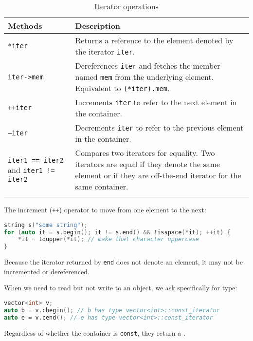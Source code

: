 \begin{longtable}{p{.25\linewidth} p{.7\linewidth}} 
\toprule
Methods & Description \\
\midrule

\texttt{*iter}
& Returns a reference to the element denoted by the iterator \texttt{iter}.
\\

\texttt{iter->mem}
&Dereferences \texttt{iter} and fetches the member named \texttt{mem} from the underlying element. Equivalent to \texttt{(*iter).mem}.
\\

\texttt{++iter}
&Increments \texttt{iter} to refer to the next element in the container.
\\

\texttt{--iter}
&Decrements \texttt{iter} to refer to the previous element in the container.
\\

\texttt{iter1 == iter2} and \texttt{iter1 != iter2}
&Compares two iterators for equality. Two iterators are equal if they denote the same element or if they are off-the-end iterator for the same container.
\\

\midrule
\caption{Iterator operations} 
\label{tab:iteratoroperations}
\end{longtable}

The increment (\texttt{++}) operator to move from one element to the next:
\begin{lstlisting}[language=C++]
string s("some string"); 
for (auto it = s.begin(); it != s.end() && !isspace(*it); ++it) {
    *it = toupper(*it); // make that character uppercase 
}
\end{lstlisting}
Because the iterator returned by \texttt{end} does not denote an element, it may not be incremented or dereferenced. 

When we need to read but not write to an object, we ask specifically for  type:
\begin{lstlisting}[language=C++]
vector<int> v;
auto b = v.cbegin(); // b has type vector<int>::const_iterator
auto e = v.cend(); // e has type vector<int>::const_iterator
\end{lstlisting}
Regardless of whether the container is \texttt{const}, they return a .

